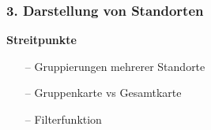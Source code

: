 \documentclass[aspectratio=1610]{beamer}
\begin{document}
	\begin{frame}[plain]
	\frametitle{3. Darstellung von Standorten}
		\begin{minipage}{0.5\textwidth}
			\setlength{\fboxsep}{0pt}%
			\setlength{\fboxrule}{1pt}%
			\captionsetup{labelformat=empty}
			\centering
		\end{minipage}%
		\begin{minipage}{0.5\textwidth}
			\textbf{Streitpunkte}
			\begin{itemize}
				\setlength\itemsep{0.3em}
				\item[--] Gruppierungen mehrerer Standorte
				\item[--] Gruppenkarte vs Gesamtkarte
				\item[--] Filterfunktion
			\end{itemize}
		\end{minipage}%
	\end{frame}
	
\end{document}
